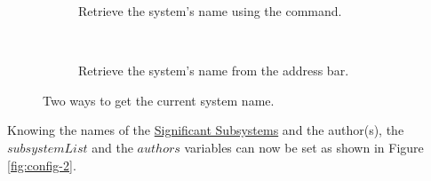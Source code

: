 \documentclass{mcscert}
\newcommand{\sigsubsnolink}{Significant Subsystems} %
\newcommand{\sigsubs}{\hyperref[def:sigsubs]{\sigsubsnolink{}}}
\begin{document}
\begin{figure}
    \centering
    \begin{subfigure}[c]{0.45\textwidth}
        \caption{Retrieve the system's name using the  command.}
        \label{fig:gcs}
    \end{subfigure}
    ~
    \begin{subfigure}[c]{0.45\textwidth}
        \caption{Retrieve the system's name from the \simulink{} address bar.}
        \label{fig:gcs-address-bar}
    \end{subfigure}
    \caption{Two ways to get the current system name.}\label{fig:current-system-name}
\end{figure}

Knowing the names of the \sigsubs{} and the author(s), the $subsystemList$ and the $authors$ variables can now be set as shown in Figure \ref{fig:config-2}.
\end{document}

